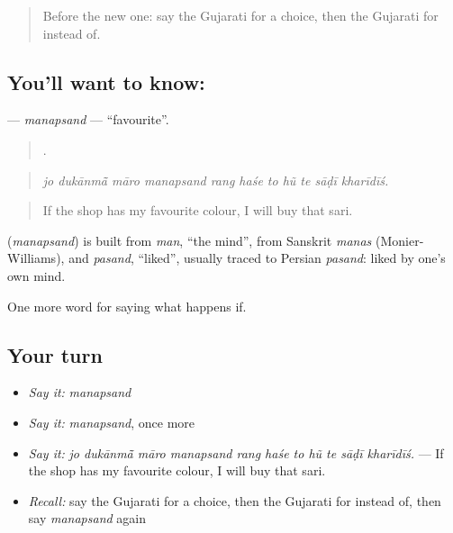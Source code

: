 \label{lesson:GU-C537-manapsand}



\begin{quote}
Before the new one: say the Gujarati for a choice, then the Gujarati for instead of.
\end{quote}

\subsection*{You'll want to know: }
\textbf{} — \emph{manapsand} — \textquotedblleft{}favourite\textquotedblright{}.

\begin{quote}
          .
\end{quote}

\begin{quote}
\emph{jo dukānmā̃ māro manapsand rang haśe to hũ te sāḍī kharīdīś.}
\end{quote}

\begin{quote}
If the shop has my favourite colour, I will buy that sari.
\end{quote}

\begin{cousinweb}
\textbf{} (\emph{manapsand}) is built from \emph{man}, \textquotedblleft{}the mind\textquotedblright{}, from Sanskrit \emph{manas} (Monier-Williams), and \emph{pasand}, \textquotedblleft{}liked\textquotedblright{}, usually traced to Persian \emph{pasand}: liked by one's own mind.
\end{cousinweb}

\begin{grammarlens}[title={What you've built}]
One more word for saying what happens if.
\end{grammarlens}

\subsection*{Your turn}
\begin{itemize}
\raggedright
  \item \emph{Say it:} \emph{manapsand}
  \item \emph{Say it:} \emph{manapsand}, once more
  \item \emph{Say it:} \emph{jo dukānmā̃ māro manapsand rang haśe to hũ te sāḍī kharīdīś.} — If the shop has my favourite colour, I will buy that sari.
  \item \emph{Recall:} say the Gujarati for a choice, then the Gujarati for instead of, then say \emph{manapsand} again
\end{itemize}

